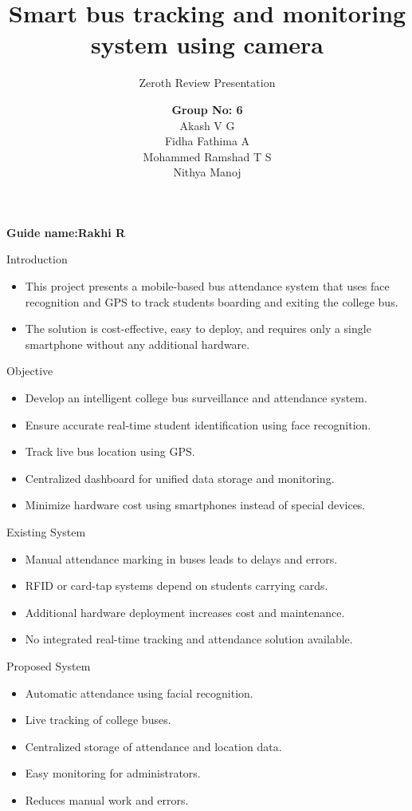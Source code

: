 \documentclass{beamer}
\title[College Bus Surveillance]{Smart bus tracking and monitoring system using camera}
\subtitle{Zeroth Review Presentation}
\author[Group 6]{
\textbf{Group No: 6}\\
Akash V G\\
Fidha Fathima A\\
Mohammed Ramshad T S\\
Nithya Manoj
}
\date{}
\begin{document}
\begin{frame}
    \titlepage
    \textbf{Guide name:Rakhi R}
\end{frame}

\begin{frame}{Introduction}
    \begin{itemize}
        \item {This project presents a mobile-based bus attendance system that uses face recognition and GPS to track students boarding and exiting the college bus.}
        \item {The solution is cost-effective, easy to deploy, and requires only a single smartphone without any additional hardware.}

    \end{itemize}
\end{frame}

\begin{frame}{Objective}
    \begin{itemize}
        \item Develop an intelligent college bus surveillance and attendance system.
        \item Ensure accurate real-time student identification using face recognition.
        \item Track live bus location using GPS.
        \item Centralized dashboard for unified data storage and monitoring.
        \item Minimize hardware cost using smartphones instead of special devices.
    \end{itemize}
\end{frame}

\begin{frame}{Existing System}
    \begin{itemize}
        \item Manual attendance marking in buses leads to delays and errors.
        \item RFID or card-tap systems depend on students carrying cards.
        \item Additional hardware deployment increases cost and maintenance.
        \item No integrated real-time tracking and attendance solution available.
    \end{itemize}
\end{frame}

\begin{frame}{Proposed System}
    \begin{itemize}
        \item Automatic attendance using facial recognition.
        \item Live tracking of college buses.
        \item Centralized storage of attendance and location data.
        \item Easy monitoring for administrators.
        \item Reduces manual work and errors.
    \end{itemize}
\end{frame}
\end{document}
